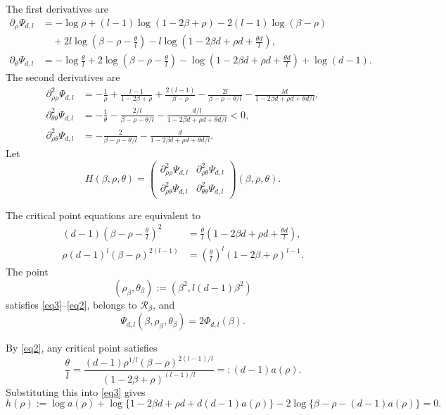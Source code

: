 \documentclass[11pt]{amsart}
\theoremstyle{plain}
\numberwithin{equation}{section}
\numberwithin{theorem}{section}
\numberwithin{figure}{section}
\begin{document}
The first derivatives are
\begin{align*}
\partial_\rho\Psi_{d,l}
&=-\log\rho+(l-1)\log(1-2\beta+\rho)-2(l-1)\log(\beta-\rho)\\
&\quad +2l\log\left(\beta-\rho-\frac{\theta}{l}\right)
-l\log\left(1-2\beta d+\rho d+\frac{\theta d}{l}\right),\\
\partial_\theta\Psi_{d,l}
&=-\log\frac{\theta}{l}+2\log\left(\beta-\rho-\frac{\theta}{l}\right)
-\log\left(1-2\beta d+\rho d+\frac{\theta d}{l}\right)+\log(d-1).
\end{align*}
The second derivatives are
\begin{align}
\partial_{\rho\rho}^2\Psi_{d,l}
&=-\frac1\rho+\frac{l-1}{1-2\beta+\rho}
+\frac{2(l-1)}{\beta-\rho}
-\frac{2l}{\beta-\rho-\theta/l}
-\frac{ld}{1-2\beta d+\rho d+\theta d/l},\label{2d1}\\
\partial_{\theta\theta}^2\Psi_{d,l}
&=-\frac1\theta-\frac{2/l}{\beta-\rho-\theta/l}
-\frac{d/l}{1-2\beta d+\rho d+\theta d/l}<0,\label{nsd}\\
\partial_{\rho\theta}^2\Psi_{d,l}
&=-\frac2{\beta-\rho-\theta/l}
-\frac d{1-2\beta d+\rho d+\theta d/l}.\label{eq:mixed-second}
\end{align}
Let
\[
H(\beta,\rho,\theta)=
\begin{pmatrix}
\partial_{\rho\rho}^2\Psi_{d,l} & \partial_{\rho\theta}^2\Psi_{d,l}\\
\partial_{\rho\theta}^2\Psi_{d,l} & \partial_{\theta\theta}^2\Psi_{d,l}
\end{pmatrix}(\beta,\rho,\theta).
\]

The critical point equations are equivalent to
\begin{align}
(d-1)\left(\beta-\rho-\frac{\theta}{l}\right)^2
&=\frac{\theta}{l}\left(1-2\beta d+\rho d+\frac{\theta d}{l}\right),\label{eq3}\\
\rho(d-1)^l(\beta-\rho)^{2(l-1)}
&=\left(\frac{\theta}{l}\right)^l(1-2\beta+\rho)^{l-1}.
\label{eq2}
\end{align}
The point
\begin{equation}
(\rho_\beta,\theta_\beta):=(\beta^2,l(d-1)\beta^2)
\label{sl1}
\end{equation}
satisfies \eqref{eq3}--\eqref{eq2}, belongs to $\mathcal R_\beta$, and
\begin{equation}
\Psi_{d,l}(\beta,\rho_\beta,\theta_\beta)=2\Phi_{d,l}(\beta).
\label{eq:Psi-at-saddle}
\end{equation}

By \eqref{eq2}, any critical point satisfies
\begin{equation}
\frac{\theta}{l}=
\frac{(d-1)\rho^{1/l}(\beta-\rho)^{2(l-1)/l}}
{(1-2\beta+\rho)^{(l-1)/l}}
=:(d-1)a(\rho).
\label{sol}
\end{equation}
Substituting this into \eqref{eq3} gives
\begin{equation*}
h(\rho):=\log a(\rho)+\log\{1-2\beta d+\rho d+d(d-1)a(\rho)\}
-2\log\{\beta-\rho-(d-1)a(\rho)\}=0.
\end{equation*}
\end{document}
